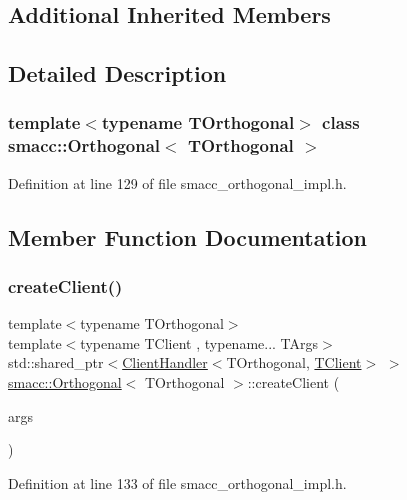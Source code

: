 \subsection*{Additional Inherited Members}


\subsection{Detailed Description}
\subsubsection*{template$<$typename T\+Orthogonal$>$\newline
class smacc\+::\+Orthogonal$<$ T\+Orthogonal $>$}



Definition at line 129 of file smacc\+\_\+orthogonal\+\_\+impl.\+h.



\subsection{Member Function Documentation}
\mbox{\label{classsmacc_1_1Orthogonal_aea19bfe584fe9c9580784a24b4690eab}} 
\subsubsection{\texorpdfstring{create\+Client()}{createClient()}}
{\footnotesize\ttfamily template$<$typename T\+Orthogonal$>$ \\
template$<$typename T\+Client , typename... T\+Args$>$ \\
std\+::shared\+\_\+ptr$<$\hyperlink{classsmacc_1_1ClientHandler}{Client\+Handler}$<$T\+Orthogonal, \hyperlink{classTClient}{T\+Client}$>$ $>$ \hyperlink{classsmacc_1_1Orthogonal}{smacc\+::\+Orthogonal}$<$ T\+Orthogonal $>$\+::create\+Client (\begin{DoxyParamCaption}\item[{T\+Args...}]{args }\end{DoxyParamCaption})\hspace{0.3cm}{\ttfamily [inline]}}



Definition at line 133 of file smacc\+\_\+orthogonal\+\_\+impl.\+h.


